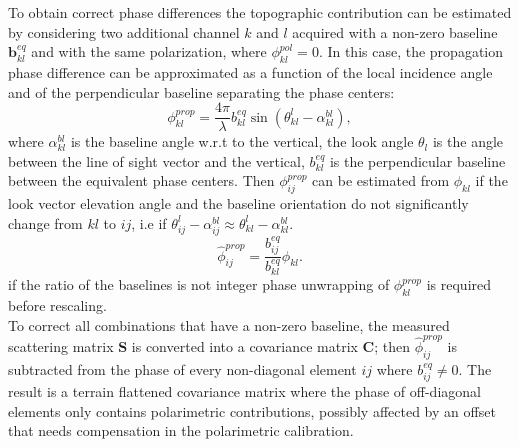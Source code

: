 To obtain correct phase differences the topographic contribution can be estimated by considering two additional channel $k$ and $l$  acquired with  a non-zero baseline $\mathbf{b}_{kl}^{eq}$ and with the same polarization, where $\phi_{kl}^{pol} = 0$. In this case, the propagation phase difference can be approximated as a function of the local incidence angle and of the perpendicular baseline separating the phase centers:
\begin{equation}\label{eq:prop_approximation}
		\phi_{kl}^{prop} = \frac{4\pi}{\lambda} b_{kl}^{eq} \sin(\theta_{kl}^l - \alpha_{kl}^{bl}),
\end{equation}
where $\alpha_{kl}^{bl}$ is the baseline angle w.r.t to the vertical, the look angle $\theta_l$ is the angle between the line of sight vector and the vertical, $b_{kl}^{eq}$ is the perpendicular baseline between the equivalent phase centers. Then $\phi_{ij}^{prop}$ can be estimated from $\phi_{kl}$ if the look vector elevation angle and the baseline orientation do not significantly change from $kl$ to $ij$, i.e if $\theta_{ij}^l - \alpha_{ij}^{bl} \approx \theta_{kl}^l - \alpha_{kl}^{bl}$. 
\begin{equation}
	\hat{\phi}_{ij}^{prop} = \frac{b_{ij}^{eq}}{b_{kl}^{eq}} \phi_{kl}.
\end{equation}
if the ratio of the baselines is not integer\cite{Massonnet1996} phase unwrapping of $\phi_{kl}^{prop}$ is required before rescaling.\\
To correct all combinations that have a non-zero baseline, the measured scattering matrix $\mathbf{S}$ is converted into a covariance matrix $\mathbf{C}$; then $\hat{\phi}_{ij}^{prop}$ is subtracted from the phase of every non-diagonal element $ij$ where $b_{ij}^{eq} \neq 0$. The result is a terrain flattened covariance matrix where the phase of off-diagonal elements only contains polarimetric contributions, possibly affected by an offset that needs compensation in the polarimetric calibration.\\
